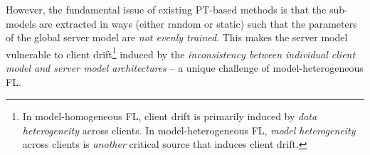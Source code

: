 \documentclass{article}
\begin{document}
However, the fundamental issue of existing PT-based methods is that the sub-models are extracted in ways (either random or static) such that the parameters of the global server model are \textit{not evenly trained}. This makes the server model vulnerable to client drift\footnote{In model-homogeneous FL, client drift is primarily induced by \textit{data heterogeneity} across clients. In model-heterogeneous FL, \textit{model heterogeneity} across clients is \textit{another} critical source that induces client drift.} induced by the \textit{inconsistency between individual client model and server model architectures} -- a unique challenge of model-heterogeneous FL.
%
%
\end{document}
